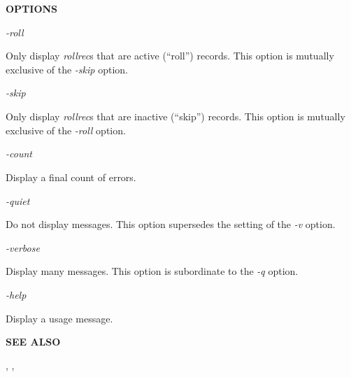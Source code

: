 {\bf OPTIONS}

\begin{description}

\item {\it -roll}\verb" "

Only display {\it rollrec}s that are active (``roll'') records.
This option is mutually exclusive of the {\it -skip} option.

\item {\it -skip}\verb" "

Only display {\it rollrec}s that are inactive (``skip'') records.
This option is mutually exclusive of the {\it -roll} option.

\item {\it -count}\verb" "

Display a final count of errors.

\item {\it -quiet}\verb" "

Do not display messages.  This option supersedes the setting of the {\it -v}
option.

\item {\it -verbose}\verb" "

Display many messages.  This option is subordinate to the {\it -q} option.

\item {\it -help}\verb" "

Display a usage message.

\end{description}


{\bf SEE ALSO}

,
,


